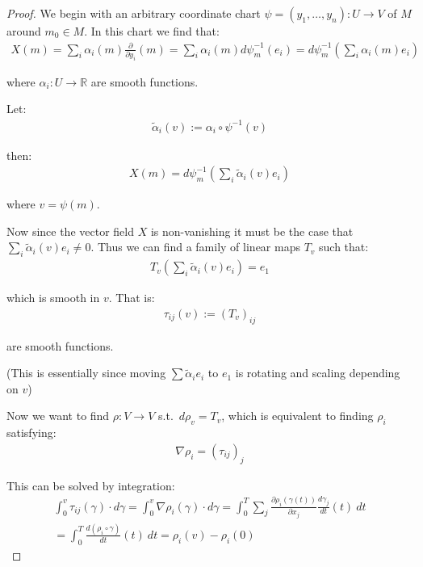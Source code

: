 		\begin{proof}
				We begin with an arbitrary coordinate chart $\psi = (y_1, \ldots, y_n) : U \to V$ of $M$ around $m_0 \in M$. In this chart we find that:
				\begin{align*}
					X(m) = \sum_i \alpha_i(m) \frac{\partial}{\partial y_i}(m) = \sum_i \alpha_i(m) d \psi_m^{-1}(e_i) = d \psi_m^{-1}\left(\sum_i \alpha_i(m) e_i\right)
				\end{align*}

				where $\alpha_i : U \to \mathbb{R}$ are smooth functions. \bigskip

				Let:
				\begin{align*}
					\tilde{\alpha}_i(v) := \alpha_i \circ \psi^{-1}(v)
				\end{align*}

				then:
				\begin{align*}
					X(m) = d \psi_m^{-1}\left(\sum_i \tilde{\alpha}_i(v) e_i \right)
				\end{align*}

				where $v = \psi(m)$. \bigskip

				Now since the vector field $X$ is non-vanishing it must be the case that $\sum_i \tilde{\alpha}_i(v) e_i \neq 0$. Thus we can find a family of linear maps $T_v$ such that:
				\begin{align*}
					T_v \left(\sum_i \tilde{\alpha}_i(v) e_i\right) = e_1
				\end{align*}

				which is smooth in $v$. That is:
				\begin{align*}
					\tau_{ij}(v) := (T_v)_{ij}
				\end{align*}

				are smooth functions. \bigskip

				(This is essentially since moving $\sum \tilde{\alpha}_i e_i$ to $e_1$ is rotating and scaling depending on $v$) \bigskip

				Now we want to find $\rho : V \to V$ s.t.\ $d \rho_v = T_v$, which is equivalent to finding $\rho_i$ satisfying:
				\begin{align*}
					\nabla \rho_i = (\tau_{ij})_j
				\end{align*}

				This can be solved by integration:
				\begin{gather*}
					\int_{0}^{v} \tau_{ij}(\gamma) \cdot d \gamma = \int_{0}^{v} \nabla \rho_i(\gamma) \cdot d \gamma = \int_0^T \sum_j \frac{\partial \rho_i(\gamma(t))}{\partial x_j} \frac{d \gamma_j}{dt}(t) \: dt \\
					= \int_0^T \frac{d(\rho_i \circ \gamma)}{dt}(t) \: dt = \rho_i(v) - \rho_i(0)
				\end{gather*}


\end{proof}
